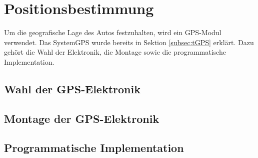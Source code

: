 \section{Positionsbestimmung}
\label{sec:GPS}
Um die geografische Lage des Autos festzuhalten, wird ein \ac{GPS}-Modul verwendet. Das System\ac{GPS} wurde bereits in Sektion \ref{subsec:tGPS} erklärt. Dazu gehört die Wahl der Elektronik, die Montage sowie die programmatische Implementation.

\subsection{Wahl der GPS-Elektronik}
\label{subsec:GPSchoice}

\subsection{Montage der GPS-Elektronik}
\label{subsec:GPSmount}

\subsection{Programmatische Implementation}
\label{subsec:GPSprogram}